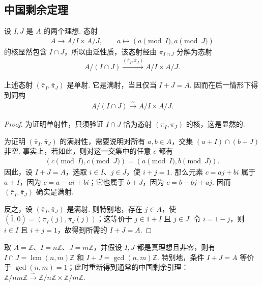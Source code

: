 \subsection{中国剩余定理}\label{sec:galois-1-2-13}
设 $I,J$ 是 $A$ 的两个理想. 态射
\begin{align*}
A\longrightarrow A/I\times A/J,\qquad a\longmapsto(a\pmod I,a\pmod J)
\end{align*}
的核显然包含 $I\cap J$，所以由泛性质，该态射经由 $\pi_{I\cap J}$ 分解为态射
\begin{align*}
A/(I\cap J)\xrightarrow{(\bar\pi_I,\bar\pi_J)}A/I\times A/J.
\end{align*}
\begin{proposition*}
上述态射 $(\bar\pi_I,\bar\pi_J)$ 是单射. 它是满射，当且仅当 $I+J=A$. 因而在后一情形下得到同构
\begin{align*}
A/(I\cap J)\xrightarrow{\sim}A/I\times A/J.
\end{align*}
\end{proposition*}
\begin{proof}
为证明单射性，只须验证 $I\cap J$ 恰为态射 $(\pi_I,\pi_J)$ 的核，这是显然的.

为证明 $(\bar\pi_I,\bar\pi_J)$ 的满射性，需要说明对所有 $a,b\in A$，交集 $(a+I)\cap(b+J)$ 非空. 事实上，若如此，则对这一交集中的任意 $c$ 都有
\begin{align*}
(c\pmod I,c\pmod J)=(a\pmod I,b\pmod J).
\end{align*}
因此，设 $I+J=A$，选取 $i\in I$、$j\in J$，使 $i+j=1$. 那么元素 $c=aj+bi$ 属于 $a+I$，因为 $c=a-ai+bi$；它也属于 $b+J$，因为 $c=b-bj+aj$. 因而 $(\bar\pi_I,\bar\pi_J)$ 确实是满射.

反之，设 $(\bar\pi_I,\bar\pi_J)$ 是满射. 则特别地，存在 $j\in A$，使 $(\bar1,0)=(\pi_I(j),\pi_J(j))$；这等价于 $j\in1+I$ 且 $j\in J$. 令 $i=1-j$，则 $i\in I$ 且 $i+j=1$，故得到所需的 $I+J=A$.
\end{proof}
\begin{example*}
取 $A=\mathbb Z$、$I=n\mathbb Z$、$J=m\mathbb Z$，并假设 $I,J$ 都是真理想且非零，则有 $I\cap J=\operatorname{lcm}(n,m)\mathbb Z$ 和 $I+J=\gcd(n,m)\mathbb Z$. 特别地，条件 $I+J=A$ 等价于 $\gcd(n,m)=1$；此时重新得到通常的中国剩余引理：$\mathbb Z/nm\mathbb Z\xrightarrow{\sim}\mathbb Z/n\mathbb Z\times\mathbb Z/m\mathbb Z$.
\end{example*}

